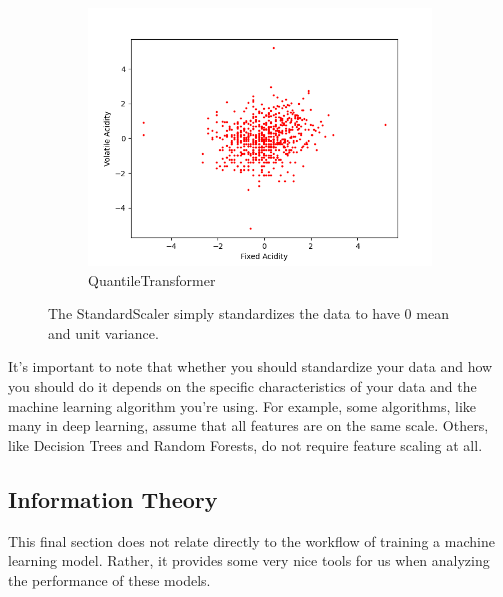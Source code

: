 \documentclass{article}
\theoremstyle{definition}
\begin{document}
\begin{figure}[hbt!]
\begin{subfigure}[b]{0.32\textwidth}
            \centering
                \includegraphics[width=\textwidth]{img/Quantile_Scaler.png}
                \caption{QuantileTransformer}
                \label{fig:quantile_transformer}
            \end{subfigure}
            
            \caption{The StandardScaler simply standardizes the data to have $0$ mean and unit variance.}
            \label{Scalers}
        \end{figure}

    It's important to note that whether you should standardize your data and how you should do it depends on the specific characteristics of your data and the machine learning algorithm you're using. For example, some algorithms, like many in deep learning, assume that all features are on the same scale. Others, like Decision Trees and Random Forests, do not require feature scaling at all. 

  \subsection{Information Theory}

    This final section does not relate directly to the workflow of training a machine learning model. Rather, it provides some very nice tools for us when analyzing the performance of these models. 
\end{document}
